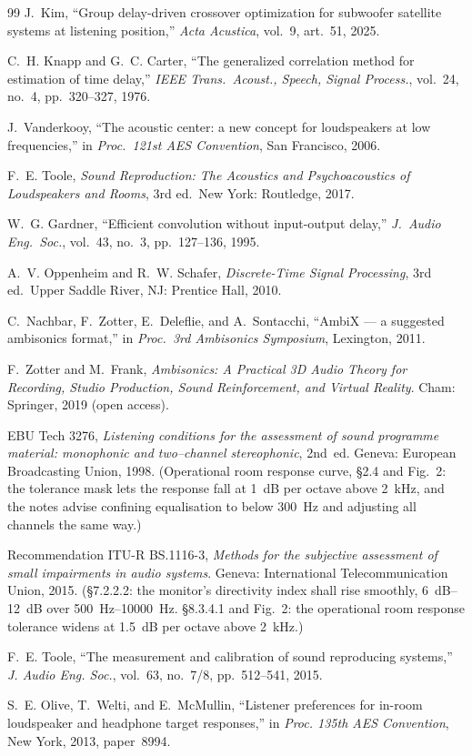 \documentclass[10pt,a4paper]{article}
\begin{document}
\begin{thebibliography}{99}
J.~Kim, ``Group delay-driven crossover optimization for subwoofer satellite
systems at listening position,'' \textit{Acta Acustica}, vol.~9, art.~51, 2025.

C.~H. Knapp and G.~C. Carter, ``The generalized correlation method for
estimation of time delay,'' \textit{IEEE Trans.\ Acoust., Speech, Signal
Process.}, vol.~24, no.~4, pp.~320--327, 1976.

J.~Vanderkooy, ``The acoustic center: a new concept for loudspeakers at low
frequencies,'' in \textit{Proc.\ 121st AES Convention}, San Francisco, 2006.

F.~E. Toole, \textit{Sound Reproduction: The Acoustics and
Psychoacoustics of Loudspeakers and Rooms}, 3rd ed.\ New York:
Routledge, 2017.

W.~G. Gardner, ``Efficient convolution without input-output delay,''
\textit{J.\ Audio Eng.\ Soc.}, vol.~43, no.~3, pp.~127--136, 1995.

A.~V. Oppenheim and R.~W. Schafer, \textit{Discrete-Time Signal
Processing}, 3rd ed.\ Upper Saddle River, NJ: Prentice Hall, 2010.

C.~Nachbar, F.~Zotter, E.~Deleflie, and A.~Sontacchi, ``AmbiX --- a
suggested ambisonics format,'' in \textit{Proc.\ 3rd Ambisonics
Symposium}, Lexington, 2011.

F.~Zotter and M.~Frank, \textit{Ambisonics: A Practical 3D Audio Theory
for Recording, Studio Production, Sound Reinforcement, and Virtual
Reality}. Cham: Springer, 2019 (open access).

EBU Tech 3276, \textit{Listening conditions for the assessment of sound
programme material: monophonic and two--channel stereophonic}, 2nd~ed.
Geneva: European Broadcasting Union, 1998. (Operational room response curve,
\S2.4 and Fig.~2: the tolerance mask lets the response fall at
\SI{1}{\dB} per octave above \SI{2}{\kilo\hertz}, and the notes advise
confining equalisation to below \SI{300}{\hertz} and adjusting all channels
the same way.)

Recommendation ITU-R BS.1116-3, \textit{Methods for the subjective assessment
of small impairments in audio systems}. Geneva: International
Telecommunication Union, 2015. (\S7.2.2.2: the monitor's directivity index
shall rise smoothly, \SIrange{6}{12}{\dB} over
\SIrange{500}{10000}{\hertz}. \S8.3.4.1 and Fig.~2: the operational room
response tolerance widens at \SI{1.5}{\dB} per octave above
\SI{2}{\kilo\hertz}.)

F.~E. Toole, ``The measurement and calibration of sound reproducing systems,''
\textit{J. Audio Eng. Soc.}, vol.~63, no.~7/8, pp.~512--541, 2015.

S.~E. Olive, T.~Welti, and E.~McMullin, ``Listener preferences for in-room
loudspeaker and headphone target responses,'' in \textit{Proc. 135th AES
Convention}, New York, 2013, paper~8994.

\end{thebibliography}
\end{document}
